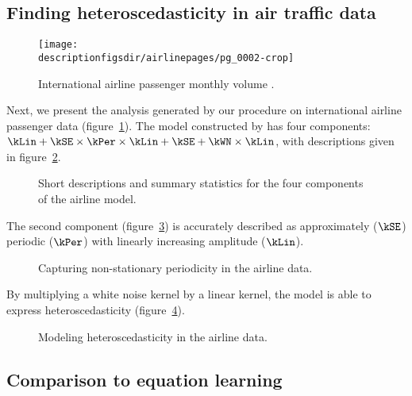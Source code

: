 \subsection{Finding heteroscedasticity in air traffic data}
\label{sec:airline}

\begin{figure}[h]
\centering
\texttt{[image: \\descriptionfigsdir/airlinepages/pg\_0002-crop]}
\caption[Airline data.]{
International airline passenger monthly volume \citep[e.g.][]{Box1976-qk}.}
\label{fig:airline}
\end{figure}

Next, we present the analysis generated by our procedure on international airline passenger data (figure~\ref{fig:airline}).
The model constructed by \procedurename{} has four components: $\kLin + \kSE \times \kPer \times \kLin + \kSE + \kWN \times \kLin$, with descriptions given in figure~\ref{fig:exec-airline}.

\begin{figure}[h]
\centering
{}
\caption[Summaries produced by \procedurename{} for the airline data.]{
Short descriptions and summary statistics for the four components of the airline model.}
\label{fig:exec-airline}
\end{figure}

The second component (figure~\ref{fig:lin_periodic}) is accurately described as approximately ($\kSE$) periodic ($\kPer$) with linearly increasing amplitude ($\kLin$).
%
\begin{figure}[h]
\centering
{}
\caption{Capturing non-stationary periodicity in the airline data.}
\label{fig:lin_periodic}
\end{figure}
%
By multiplying a white noise kernel by a linear kernel, the model is able to express heteroscedasticity (figure~\ref{fig:heteroscedastic}).
%
\begin{figure}[h]
\centering
{}
\caption{Modeling heteroscedasticity in the airline data.}
\label{fig:heteroscedastic}
\end{figure}

\subsection{Comparison to equation learning}
\label{sec:eqn-learning-comp}

